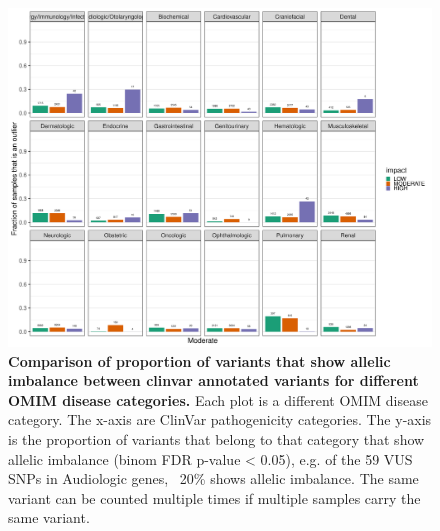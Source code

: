 \begin{figure}[h!]
	\includegraphics[width=\textwidth]{chapters/chapter3-allele-specific-expression/img/fig3.pdf}
	\caption{\textbf{Comparison of proportion of variants that show allelic imbalance between clinvar annotated variants for different OMIM disease categories.} Each plot is a different OMIM disease category. The x-axis are ClinVar pathogenicity categories. The y-axis is the proportion of variants that belong to that category that show allelic imbalance (binom FDR p-value < 0.05), e.g. of the 59 VUS SNPs in Audiologic genes, ~20\% shows allelic imbalance. The same variant can be counted multiple times if multiple samples carry the same variant. }
	\label{ase_fig3}
\end{figure}


